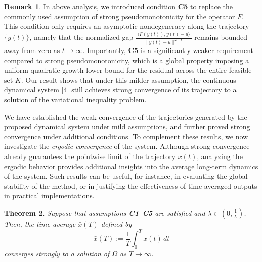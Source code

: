 \documentclass[hidelinks,11 pt]{article}
\numberwithin{equation}{section}
\newtheorem{theorem}{Theorem}[section]
\theoremstyle{definition}  %
\newtheorem{remark}[theorem]{Remark}
\numberwithin{equation}{section}
\numberwithin{theorem}{section}
\begin{document}
\begin{remark}
In above analysis, we introduced condition \textbf{C5} to replace the commonly used assumption of strong pseudomonotonicity for the operator $F$. This condition only requires an asymptotic nondegeneracy along the trajectory $\{y(t)\}$, namely that the normalized gap $\frac{|\langle F(y(t)), y(t) - u \rangle|}{\|y(t) - u\|^{2 + \epsilon}}$ remains bounded away from zero as $t \to \infty$. Importantly, \textbf{C5} is a significantly weaker requirement compared to strong pseudomonotonicity, which is a global property imposing a uniform quadratic growth lower bound for the residual across the entire feasible set $K$. Our result shows that under this milder assumption, the continuous dynamical system \eqref{4} still achieves strong convergence of its trajectory to a solution of the variational inequality problem.
\end{remark}
\vskip 2mm
We have established the weak convergence of the trajectories generated by the proposed dynamical system under mild assumptions, and further proved strong convergence under additional conditions. To complement these results, we now investigate the \emph{ergodic convergence} of the system.
Although strong convergence already guarantees the pointwise limit of the trajectory \(x(t)\), analyzing the ergodic behavior provides additional insights into the average long-term dynamics of the system. Such results can be useful, for instance, in evaluating the global stability of the method, or in justifying the effectiveness of time-averaged outputs in practical implementations.
\begin{theorem}
    Suppose that assumptions \textbf{C1}–\textbf{C5} are satisfied and $\lambda\in(0,\frac{1}{L})$. Then, the time-average \( \bar{x}(T) \) defined by
    \[
    \bar{x}(T) := \frac{1}{T} \int_0^T x(t)\,dt
    \]
    converges strongly to a solution of $\Omega$ as \( T \to \infty \).
\end{theorem}
\end{document}
